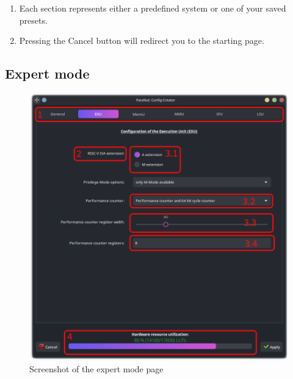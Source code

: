 \begin{enumerate}
	\item Each section represents either a predefined system or one of your saved presets. 
	\item Pressing the \glqq Cancel\grqq{}  button will redirect you to the starting page.

\end{enumerate}
\newpage
\subsection{Expert mode}

\begin{figure}[!h]
    \noindent \begin{centering}
        \includegraphics[width=15cm]{images/pn_config_creator_edit_page}
        \par\end{centering}
    \caption{Screenshot of the expert mode page}
\end{figure}

